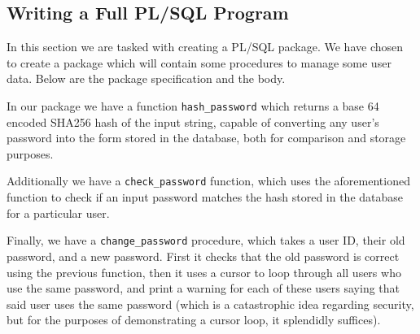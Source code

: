 \subsection{Writing a Full PL/SQL Program}

In this section we are tasked with creating a PL/SQL package. We have chosen to create a package which will contain some procedures to manage some user data. Below are the package specification and the body.

In our package we have a function \verb`hash_password` which returns a base 64 encoded SHA256 hash of the input string, capable of converting any user's password into the form stored in the database, both for comparison and storage purposes.

Additionally we have a \verb`check_password` function, which uses the aforementioned function to check if an input password matches the hash stored in the database for a particular user.

Finally, we have a \verb`change_password` procedure, which takes a user ID, their old password, and a new password. First it checks that the old password is correct using the previous function, then it uses a cursor to loop through all users who use the same password, and print a warning for each of these users saying that said user uses the same password (which is a catastrophic idea regarding security, but for the purposes of demonstrating a cursor loop, it splendidly suffices).

